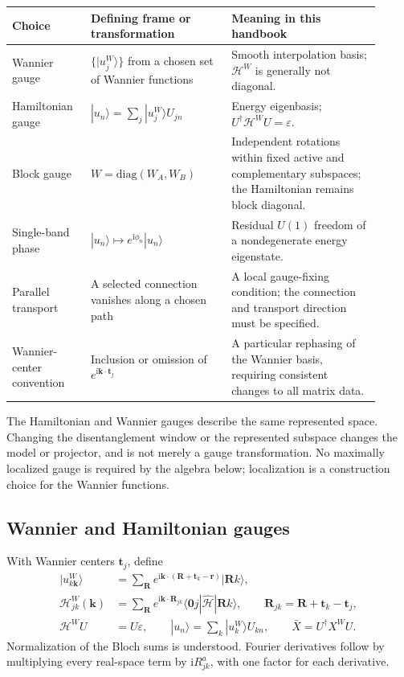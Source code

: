\documentclass[prx,amsmath,amssymb,superscriptaddress,longbibliography]{revtex4-2}
\newcommand{\ii}{\mathrm{i}}
\begin{document}
\begin{center}
\setlength{\tabcolsep}{5pt}
\renewcommand{\arraystretch}{1.15}
\begin{tabular}{p{0.19\linewidth}p{0.35\linewidth}p{0.37\linewidth}}
\toprule
Choice & Defining frame or transformation & Meaning in this handbook\\
\midrule
Wannier gauge & $\{|u_j^W\rangle\}$ from a chosen set of Wannier functions
& Smooth interpolation basis; $\mathcal H^W$ is generally not diagonal.\\
Hamiltonian gauge & $|u_n\rangle=\sum_j|u_j^W\rangle U_{jn}$
& Energy eigenbasis; $U^\dagger\mathcal H^W U=\varepsilon$.\\
Block gauge & $W=\mathrm{diag}(W_A,W_B)$
& Independent rotations within fixed active and complementary subspaces;
the Hamiltonian remains block diagonal.\\
Single-band phase & $|u_n\rangle\mapsto e^{\ii\phi_n}|u_n\rangle$
& Residual $U(1)$ freedom of a nondegenerate energy eigenstate.\\
Parallel transport & A selected connection vanishes along a chosen path
& A local gauge-fixing condition; the connection and transport direction must be specified.\\
Wannier-center convention & Inclusion or omission of $e^{\ii\bm k\cdot\bm t_j}$
& A particular rephasing of the Wannier basis, requiring consistent changes to all matrix data.\\
\bottomrule
\end{tabular}
\end{center}
The Hamiltonian and Wannier gauges describe the same represented space.
Changing the disentanglement window or the represented subspace changes the
model or projector, and is not merely a gauge transformation.
No maximally localized gauge is required by the algebra below; localization
is a construction choice for the Wannier functions.

\subsection{Wannier and Hamiltonian gauges}
\label{sec:WH-gauges}
With Wannier centers $\bm t_j$, define
\begin{align}
 |u_{k\bm k}^{W}\rangle
 &=\sum_{\bm R}e^{\ii\bm k\cdot(\bm R+\bm t_k-\bm r)}|\bm Rk\rangle,
 \\
 \mathcal H_{jk}^{W}(\bm k)
 &=\sum_{\bm R}e^{\ii\bm k\cdot\bm R_{jk}}
 \langle\bm0 j|\hat{\mathcal H}|\bm Rk\rangle,
 \qquad \bm R_{jk}=\bm R+\bm t_k-\bm t_j,
 \label{eq:fourier}\\
 \mathcal H^W U&=U\varepsilon,\qquad
 |u_n\rangle=\sum_k|u_k^W\rangle U_{kn},\qquad
 \bar X=U^\dagger X^W U.
 \label{eq:gauges}
\end{align}
Normalization of the Bloch sums is understood.
Fourier derivatives follow by multiplying every real-space term by
$\ii R_{jk}^a$, with one factor for each derivative.
\end{document}
